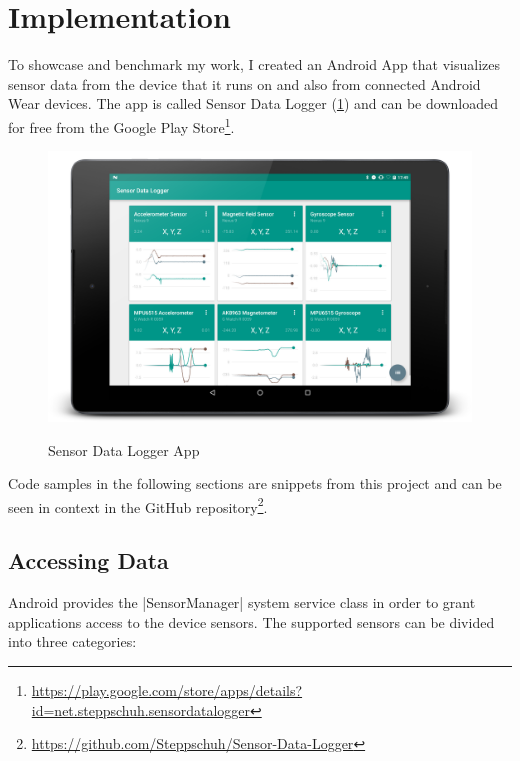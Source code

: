 \section{Implementation}
\label{sec:implementation}

To showcase and benchmark my work, I created an Android App that visualizes sensor data from the device that it runs on and also from connected Android Wear devices.
The app is called Sensor Data Logger (\ref{fig:sensorDataLoggerApp}) and can be downloaded for free from the Google Play Store\footnote{\href{https://play.google.com/store/apps/details?id=net.steppschuh.sensordatalogger}{https://play.google.com/store/apps/details?id=net.steppschuh.sensordatalogger}}.

\begin{figure}[H]
	\href{https://github.com/Steppschuh/Sensor-Data-Logger}{
		\includegraphics[width=\linewidth]{images/app/charts_landscape_framed.png}
	}
	\caption[Caption for Sensor Data Logger App]{Sensor Data Logger App}
	\label{fig:sensorDataLoggerApp}
\end{figure}

Code samples in the following sections are snippets from this project and can be seen in context in the GitHub repository\footnote{\href{https://github.com/Steppschuh/Sensor-Data-Logger}{https://github.com/Steppschuh/Sensor-Data-Logger}}.

\clearpage

\subsection{Accessing Data}
\label{sec:implementation:accessingdata}

Android provides the |SensorManager|\cite{androiddocs:sensormanager} system service class in order to grant applications access to the device sensors.
The supported sensors can be divided into three categories:

